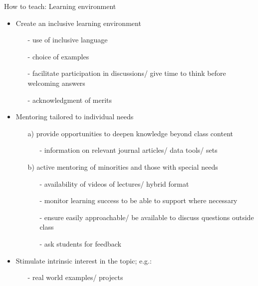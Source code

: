 \begin{frame}{How to teach: Learning environment} %
	\vspace{-2.5mm}
	\begin{itemize}%
		\item<+-> Create an \alert{inclusive} learning environment %
		\begin{itemize}[<+->]
			\item[-] use of inclusive language
			\item[-] choice of examples
			\item[-] facilitate participation in discussions/ give time to think before welcoming answers
			\item[-] acknowledgment of merits
		\end{itemize}
		\vspace{1mm}
		\item<+-> \alert{Mentoring} tailored to \alert{individual needs}
		\begin{itemize}[<+->]
			\item[a)] provide opportunities to deepen knowledge beyond class content 
			\begin{itemize}
				\item[-] information on relevant journal articles/ data tools/ sets
			\end{itemize}
			\item[b)]  active mentoring of minorities and those with special needs
			\begin{itemize}
				\item[-] availability of videos of lectures/ hybrid format
				\item[-] monitor learning success to be able to support where necessary
				\item[-] ensure easily approachable/ be available to discuss questions outside class
				\item[-] ask students for feedback 
			\end{itemize}
		\end{itemize}		
		\vspace{1mm}		
		\item<+-> Stimulate \alert{intrinsic interest} in the topic; e.g.: 
		\begin{itemize}[<+->]
			\item[-] real world examples/ projects %
		\end{itemize}
	\end{itemize}
\end{frame}

